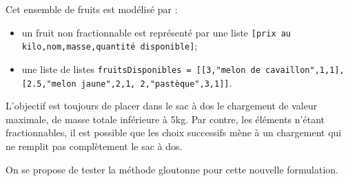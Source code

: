 Cet ensemble de fruits est modélisé par :
\begin{itemize}
\item un fruit non fractionnable est représenté par une liste \texttt{[prix au kilo,nom,masse,quantité disponible]};
\item une liste de listes \texttt{fruitsDisponibles = [[3,"melon de cavaillon",1,1], [2.5,"melon jaune",2,1, 2,"pastèque",3,1]]}.
\end{itemize}



L’objectif est toujours de placer dans le sac à dos le chargement de valeur maximale, de masse totale inférieure à 5kg. Par contre, les éléments n’étant fractionnables, il est possible que les choix successifs mène à un chargement qui ne remplit pas complètement le sac à dos.

On se propose de tester la méthode gloutonne pour cette nouvelle formulation. 





